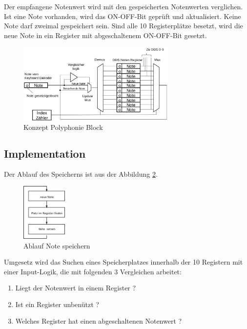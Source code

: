 Der empfangene Notenwert wird mit den gespeicherten Notenwerten verglichen. Ist eine Note vorhanden, wird das ON-OFF-Bit geprüft und aktualisiert. Keine Note darf zweimal gespeichert sein. Sind alle 10 Registerplätze besetzt, wird die neue Note in ein Register mit abgeschaltenem ON-OFF-Bit gesetzt.

\begin{figure}[H]
	\includegraphics[width=0.7\textwidth]{images/midi_interface/Konzept_Hans_polyphonie.png}
	\caption{Konzept Polyphonie Block \cite{konzept_poly} }
	\label{fig.polyphnie_konzept}
\end{figure}

\subsection{Implementation}

Der Ablauf des Speicherns ist aus der Abbildung \ref{fig.polyphnie_ablauf}.

\begin{figure}[H]
	\includegraphics[width=0.2\textwidth]{images/midi_interface/polyphnie_ablauf.png}
	\caption{Ablauf Note speichern }
	\label{fig.polyphnie_ablauf}
\end{figure}

Umgesetz wird das Suchen eines Speicherplatzes innerhalb der 10 Registern mit einer Input-Logik, die mit folgenden 3 Vergleichen arbeitet:

\begin{enumerate}
	\item Liegt der Notenwert in einem Register ? 
	\item Ist ein Register unbenützt ?
	\item Welches Register hat einen abgeschaltenen Notenwert ?
\end{enumerate}

